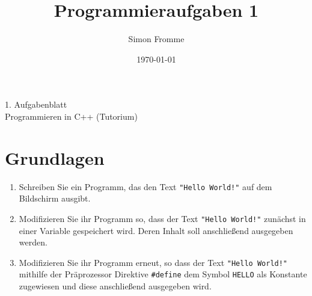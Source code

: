 \documentclass[paper=a4, fontsize=11pt, twoside]{scrartcl}
\title{Programmieraufgaben 1}
\author{Simon Fromme}
\date{\normalsize\today}
\begin{document}
\vspace*{0.75\baselineskip}
\begin{center}
  \Large 1. Aufgabenblatt \\\vspace{0.5em} \large Programmieren in C++ (Tutorium)
\end{center}

\section*{Grundlagen}
\begin{enumerate}
\item Schreiben Sie ein Programm, das den Text \texttt{"Hello World!"} auf dem Bildschirm ausgibt.
\item Modifizieren Sie ihr Programm so, dass der Text \texttt{"Hello World!"} zunächst in einer Variable gespeichert wird. Deren Inhalt soll anschließend ausgegeben werden.
\item Modifizieren Sie ihr Programm erneut, so dass der Text \texttt{"Hello World!"} mithilfe der Präprozessor Direktive \texttt{#define} dem Symbol \texttt{HELLO} als Konstante zugewiesen und diese anschließend ausgegeben wird.
\end{enumerate}
\end{document}
